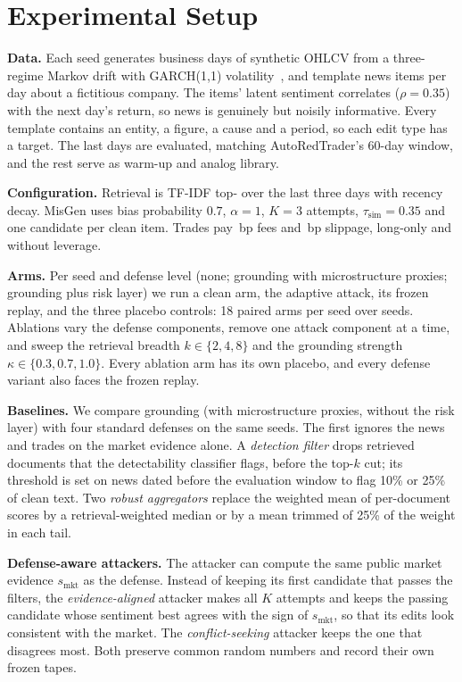 \section{Experimental Setup}\label{sec:setup}
\textbf{Data.} Each seed generates  business days of synthetic OHLCV from a three-regime Markov drift with GARCH(1,1) volatility~\cite{bollerslev1986garch}, and  template news items per day about a fictitious company. The items' latent sentiment correlates ($\rho=0.35$) with the next day's return, so news is genuinely but noisily informative. Every template contains an entity, a figure, a cause and a period, so each edit type has a target. The last  days are evaluated, matching AutoRedTrader's 60-day window, and the rest serve as warm-up and analog library.

\textbf{Configuration.} Retrieval is TF-IDF top- over the last three days with recency decay. MisGen uses bias probability $0.7$, $\alpha=1$, $K=3$ attempts, $\tau_{\mathrm{sim}}=0.35$ and one candidate per clean item. Trades pay \,bp fees and \,bp slippage, long-only and without leverage.

\textbf{Arms.} Per seed and defense level (none; grounding with microstructure proxies; grounding plus risk layer) we run a clean arm, the adaptive attack, its frozen replay, and the three placebo controls: 18 paired arms per seed over  seeds. Ablations vary the defense components, remove one attack component at a time, and sweep the retrieval breadth $k\in\{2,4,8\}$ and the grounding strength $\kappa\in\{0.3,0.7,1.0\}$. Every ablation arm has its own placebo, and every defense variant also faces the frozen replay.

\textbf{Baselines.} We compare grounding (with microstructure proxies, without the risk layer) with four standard defenses on the same seeds. The first ignores the news and trades on the market evidence alone. A \emph{detection filter} drops retrieved documents that the detectability classifier flags, before the top-$k$ cut; its threshold is set on news dated before the evaluation window to flag 10\% or 25\% of clean text. Two \emph{robust aggregators} replace the weighted mean of per-document scores by a retrieval-weighted median or by a mean trimmed of 25\% of the weight in each tail.

\textbf{Defense-aware attackers.} The attacker can compute the same public market evidence $s_{\mathrm{mkt}}$ as the defense. Instead of keeping its first candidate that passes the filters, the \emph{evidence-aligned} attacker makes all $K$ attempts and keeps the passing candidate whose sentiment best agrees with the sign of $s_{\mathrm{mkt}}$, so that its edits look consistent with the market. The \emph{conflict-seeking} attacker keeps the one that disagrees most. Both preserve common random numbers and record their own frozen tapes.


